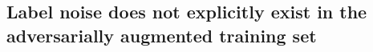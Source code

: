 \subsection{Label noise does not explicitly exist in the adversarially augmented training set}
\label{sect:label-flipping-noise}






